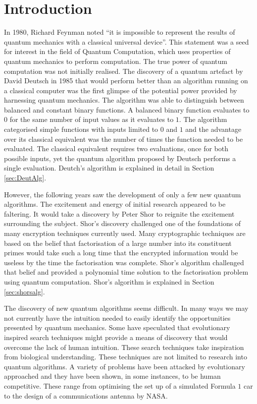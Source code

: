 \chapter{Introduction}
 \setcounter{page}{0} 

In 1980, Richard Feynman noted ``it is impossible to represent the results of quantum mechanics with a classical universal device''\cite{Feynman82simulatingphysics}.
This statement was a seed for interest in the field of Quantum Computation, which uses properties of quantum mechanics to perform computation.
The true power of quantum computation was not initially realised.
The discovery of a quantum artefact by David Deutsch\cite{Deutsch85quantumtheory} in 1985 that would perform better than an algorithm running on a classical computer was the first glimpse of the potential power provided by harnessing quantum mechanics.
The algorithm was able to distinguish between balanced and constant binary functions.
A balanced binary function evaluates to $0$ for the same number of input values as it evaluates to $1$. 
The algorithm categorised simple functions with inputs limited to $0$ and $1$ and the advantage over its classical equivalent was the number of times the function needed to be evaluated.
The classical equivalent requires two evaluations, once for both possible inputs, yet the quantum algorithm proposed by Deutsch performs a single evaluation.
Deutch's algorithm is explained in detail in Section \ref{sec:DeutAlg}.

However, the following years saw the development of only a few new quantum algorithms.
The excitement and energy of initial research appeared to be faltering.
It would take a discovery by Peter Shor\cite{Shor:1994jg} to reignite the excitement surrounding the subject.
Shor's discovery challenged one of the foundations of many encryption techniques currently used.
Many cryptographic techniques are based on the belief that factorisation of a large number into its constituent primes would take such a long time that the encrypted information would be useless by the time the factorisation was complete.
Shor's algorithm challenged that belief and provided a polynomial time solution to the factorisation problem using quantum computation.
Shor's algorithm is explained in Section \ref{sec:shorsalg}.

The discovery of new quantum algorithms seems difficult.
In many ways we may not currently have the intuition needed to easily identify the opportunities presented by quantum mechanics.
Some have speculated that evolutionary inspired search techniques might provide a means of discovery that would overcome the lack of human intuition.
These search techniques take inspiration from biological understanding.
These techniques are not limited to research into quantum algorithms.
A variety of problems have been attacked by evolutionary approached and they have been shown, in some instances, to be human competitive.
These range from optimising the set up of a simulated Formula $1$ car\cite{Wloch04optimisingthe} to the design of a communications antenna\cite{antennades} by NASA.

